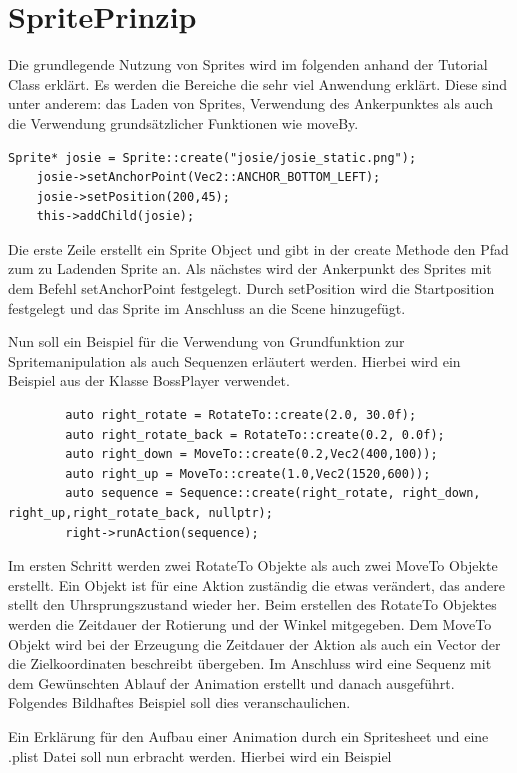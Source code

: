 \section{SpritePrinzip}
Die grundlegende Nutzung von Sprites wird im folgenden anhand der Tutorial Class erklärt. Es werden die Bereiche die sehr viel Anwendung erklärt. Diese sind unter anderem: das Laden von Sprites, Verwendung des Ankerpunktes als auch die Verwendung grundsätzlicher Funktionen wie moveBy.

\begin{lstlisting}
Sprite* josie = Sprite::create("josie/josie_static.png");
	josie->setAnchorPoint(Vec2::ANCHOR_BOTTOM_LEFT);
	josie->setPosition(200,45);
	this->addChild(josie);
\end{lstlisting}

Die erste Zeile erstellt ein Sprite Object und gibt in der create Methode den Pfad zum zu Ladenden Sprite an. Als nächstes wird der Ankerpunkt des Sprites mit dem Befehl setAnchorPoint festgelegt. Durch setPosition wird die Startposition festgelegt und das Sprite im Anschluss an die Scene hinzugefügt. 


Nun soll ein Beispiel für die Verwendung von Grundfunktion zur Spritemanipulation als auch Sequenzen erläutert werden. Hierbei wird ein Beispiel aus der Klasse BossPlayer verwendet.

\begin{lstlisting}
		auto right_rotate = RotateTo::create(2.0, 30.0f);
		auto right_rotate_back = RotateTo::create(0.2, 0.0f);
		auto right_down = MoveTo::create(0.2,Vec2(400,100));
		auto right_up = MoveTo::create(1.0,Vec2(1520,600));
		auto sequence = Sequence::create(right_rotate, right_down, right_up,right_rotate_back, nullptr);
		right->runAction(sequence);
\end{lstlisting}

Im ersten Schritt werden zwei RotateTo Objekte als auch zwei MoveTo Objekte erstellt. Ein Objekt ist für eine Aktion zuständig die etwas verändert, das andere stellt den Uhrsprungszustand wieder her. Beim erstellen des RotateTo Objektes werden die Zeitdauer der Rotierung und der Winkel mitgegeben. Dem MoveTo Objekt wird bei der Erzeugung die Zeitdauer der Aktion als auch ein Vector der die Zielkoordinaten beschreibt übergeben. Im Anschluss wird eine Sequenz mit dem Gewünschten Ablauf der Animation erstellt und danach ausgeführt. Folgendes Bildhaftes Beispiel soll dies veranschaulichen. 


Ein Erklärung für den Aufbau einer Animation durch ein Spritesheet und eine .plist Datei soll nun erbracht werden. Hierbei wird ein Beispiel

